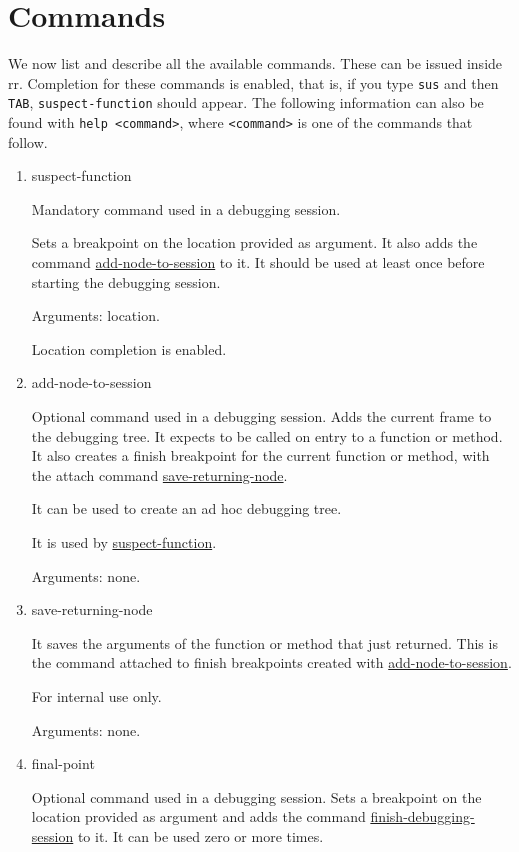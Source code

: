 \section{Commands}
We now list and describe all the available commands. These can be issued inside rr. Completion for these commands is enabled, that is, if you type \verb|sus| and then \verb|TAB|, \verb|suspect-function| should appear.
The following information can also be found with \verb|help <command>|, where \verb|<command>| is one of the commands that follow.

\begin{enumerate}
    \item suspect-function
\label{command:suspect-function}

Mandatory command used in a debugging session.

Sets a breakpoint on the location provided as argument. It also adds the command \hyperref[command:add-node-to-session]{add-node-to-session} to it.
It should be used at least once before starting the debugging session.

Arguments: location.

Location completion is enabled.


\item add-node-to-session
\label{command:add-node-to-session}

Optional command used in a debugging session.
Adds the current frame to the debugging tree.
It expects to be called on entry to a function or method.
It also creates a finish breakpoint for the current function or method, with the attach command \hyperref[command:save-returning-node]{save-returning-node}.

It can be used to create an ad hoc debugging tree.

It is used by \hyperref[command:suspect-function]{suspect-function}.

Arguments: none.
\item save-returning-node
\label{command:save-returning-node}

It saves the arguments of the function or method that just returned.
This is the command attached to finish breakpoints created with \hyperref[command:add-node-to-session]{add-node-to-session}.

For internal use only.

Arguments: none.
\item final-point
\label{command:final-point}

Optional command used in a debugging session.
Sets a breakpoint on the location provided as argument and adds the command \hyperref[command:finish-debugging-session]{finish-debugging-session} to it.
It can be used zero or more times.


\end{enumerate}
